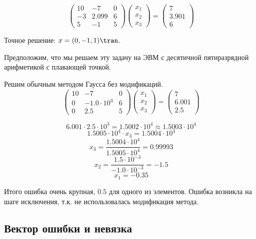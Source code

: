 \begin{example}
    \[\begin{pmatrix}
            10  & - 7   & 0 \\
            - 3 & 2.099 & 6 \\
            5   & - 1   & 5
        \end{pmatrix} \begin{pmatrix}
            x_1 \\ x_2 \\ x_3
        \end{pmatrix} = \begin{pmatrix}
            7 \\ 3.901 \\ 6
        \end{pmatrix} \]

    Точное решение: \(x = (0, - 1, 1)\tran \).

    Предположим, что мы решаем эту задачу на ЭВМ с десятичной пятиразрядной арифметикой с плавающей точкой.

    Решим обычным методом Гаусса без модификаций.
    \[\begin{pmatrix}
            10 & - 7              & 0 \\
            0  & - 1.0 \cdot 10^3 & 6 \\
            0  & 2.5              & 5
        \end{pmatrix} \begin{pmatrix}
            x_1 \\ x_2 \\ x_3
        \end{pmatrix} = \begin{pmatrix}
            7 \\ 6.001 \\ 2.5 \end{pmatrix}\]

    \[
        6.001 \cdot 2.5  \cdot 10^3 = 1.5002 \cdot 10^4 \approx 1.5003 \cdot 10^4
    \]
    \[1.5005 \cdot 10^4 \cdot x_3 = 1.5004 \cdot 10^4\]
    \[x_3 = \frac{1.5004 \cdot 10^4}{1.5005 \cdot 10^4} = 0.99993\]
    \[x_2 = \frac{1.5 \cdot 10^{ - 3}}{ - 1.0 \cdot 10^{ - 3}} = - 1.5\]
    \[x_1 = - 0.35\]

    Итого ошибка очень крупная, \(0.5\) для одного из элементов. Ошибка возникла на шаге исключения, т.к. не использовалась модификация метода.
\end{example}

\subsection{Вектор ошибки и невязка}

